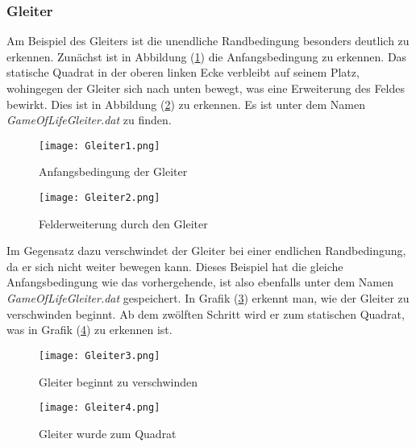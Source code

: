 \documentclass{scrartcl}
\begin{document}
\subsubsection{Gleiter}
Am Beispiel des Gleiters ist die unendliche Randbedingung besonders deutlich zu erkennen. Zunächst ist in Abbildung (\ref{gleit1}) die Anfangsbedingung zu erkennen. Das statische Quadrat in der oberen linken Ecke verbleibt auf seinem Platz, wohingegen der Gleiter sich nach unten bewegt, was eine Erweiterung des Feldes bewirkt. Dies ist in Abbildung (\ref{gleit2}) zu erkennen. Es ist unter dem Namen \textit{GameOfLifeGleiter.dat} zu finden.

\begin{figure}[p]
	\begin{center}
		\texttt{[image: Gleiter1.png]}
		\caption{Anfangsbedingung der Gleiter}
		\label{gleit1}
	\end{center}
\end{figure}
\begin{figure}[p]
	\begin{center}
		\texttt{[image: Gleiter2.png]}
		\caption{Felderweiterung durch den Gleiter}
		\label{gleit2}
	\end{center}
\end{figure}

Im Gegensatz dazu verschwindet der Gleiter bei einer endlichen Randbedingung, da er sich nicht weiter bewegen kann. Dieses Beispiel hat die gleiche Anfangsbedingung wie das vorhergehende, ist also ebenfalls unter dem Namen \textit{GameOfLifeGleiter.dat} gespeichert. In Grafik (\ref{gleit3}) erkennt man, wie der Gleiter zu verschwinden beginnt. Ab dem zwölften Schritt wird er zum statischen Quadrat, was in Grafik (\ref{gleit4}) zu erkennen ist.

\begin{figure}[p]
	\begin{center}
		\texttt{[image: Gleiter3.png]}
		\caption{Gleiter beginnt zu verschwinden}
		\label{gleit3}
	\end{center}
\end{figure}
\begin{figure}[p]
	\begin{center}
		\texttt{[image: Gleiter4.png]}
		\caption{Gleiter wurde zum Quadrat}
		\label{gleit4}
	\end{center}
\end{figure}
\end{document}
